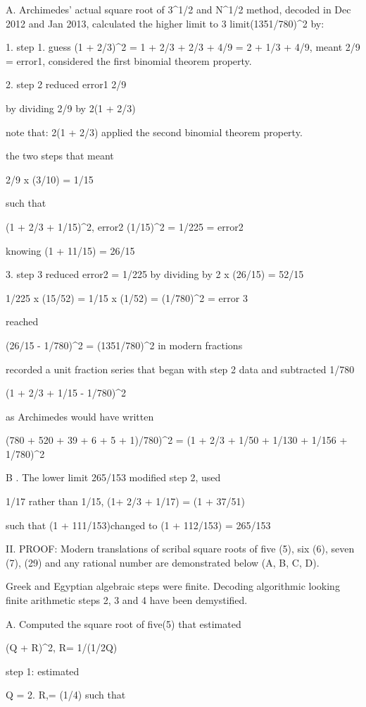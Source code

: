 \documentclass[12pt]{article}
\begin{document}
A. Archimedes' actual square root of 3^1/2 and N^1/2  method, decoded in Dec 2012 and Jan 2013, calculated the higher limit to 3  limit(1351/780)^2 by:

1. step 1. guess (1 + 2/3)^2 = 1 + 2/3 + 2/3 +  4/9 = 2 + 1/3 + 4/9, meant  2/9 =   error1, considered the first binomial theorem property.  

2. step 2 reduced error1 2/9 

by dividing 2/9 by 2(1 + 2/3)

note that:  2(1 + 2/3)  applied the second  binomial theorem property.

the two steps that meant

2/9 x (3/10) = 1/15

such that

(1 + 2/3 + 1/15)^2, error2 (1/15)^2 = 1/225 = error2

knowing (1 + 11/15) = 26/15

3. step 3 reduced error2 = 1/225 by dividing by 2 x (26/15) = 52/15

1/225 x (15/52) = 1/15 x (1/52) = (1/780)^2 = error 3

reached

(26/15 - 1/780)^2 = (1351/780)^2 in modern fractions

recorded a unit fraction series that began with step 2 data and subtracted 1/780

(1 + 2/3 + 1/15 - 1/780)^2

as Archimedes would have written

(780 + 520 + 39 + 6 + 5 + 1)/780)^2 = (1 + 2/3 + 1/50 + 1/130 + 1/156 + 1/780)^2

B . The lower limit 265/153 modified step 2, used
  
1/17 rather than 1/15, (1+ 2/3 + 1/17) = (1 + 37/51)

such that (1 + 111/153)changed to (1 + 112/153) = 265/153

II. PROOF: Modern translations of scribal square roots of five (5), six (6), seven (7), (29) and any rational number are demonstrated below (A, B, C, D).

Greek and Egyptian algebraic steps were finite. Decoding algorithmic looking finite arithmetic steps 2, 3 and 4 have been demystified.

A. Computed the square root of five(5) that estimated

(Q + R)^2, R= 1/(1/2Q)

step 1: estimated

Q = 2. R,= (1/4) such that
\end{document}
